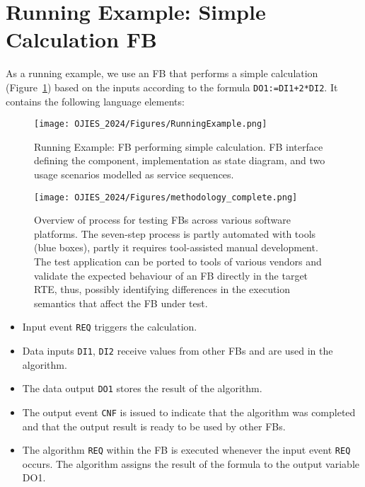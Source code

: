 \section{Running Example: Simple Calculation FB}
\label{sec::running_example}
As a running example, we use an FB that performs a simple calculation (Figure~\ref{fig:running_example}) based on the inputs according to the formula \texttt{DO1:=DI1+2*DI2}. It contains the following language elements:

\begin{figure}[b]
    \centering
    \texttt{[image: OJIES\_2024/Figures/RunningExample.png]}
    \caption{Running Example: FB performing simple calculation. FB interface defining the component, implementation as state diagram, and two usage scenarios modelled as service sequences.}
    \label{fig:running_example}
\end{figure}
\begin{figure*}[t!]
	\centering
	\texttt{[image: OJIES\_2024/Figures/methodology\_complete.png]}
	\caption{Overview of process for testing FBs across various software platforms. The seven-step process is partly automated with tools (blue boxes), partly it requires tool-assisted manual development. The test application can be ported to tools of various vendors and validate the expected behaviour of an FB directly in the target RTE, thus, possibly identifying differences in the execution semantics that affect the FB under test.}
	\label{fig::methodology}
\end{figure*}

\begin{itemize}
   \item Input event \texttt{REQ} triggers the calculation.
   \item Data inputs \texttt{DI1}, \texttt{DI2} receive values from other FBs and are used in the algorithm.
   \item The data output \texttt{DO1} stores the result of the algorithm.
   \item The output event \texttt{CNF} is issued to indicate that the algorithm was completed and that the output result is ready to be used by other FBs.
   \item The algorithm \texttt{REQ} within the FB is executed whenever the input event \texttt{REQ} occurs. The algorithm assigns the result of the formula to the output variable DO1.
\end{itemize}

